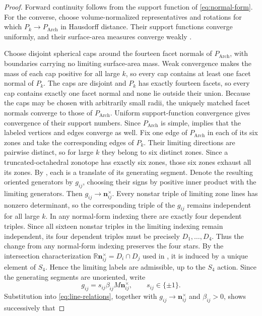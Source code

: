 \documentclass[11pt]{article}
\newcommand{\R}{\mathbb R}
\newcommand{\Arch}{P_{\mathrm{Arch}}}
\newcommand{\mb}[1]{\mathbf{#1}}
\theoremstyle{remark}
\begin{document}
\begin{proof}
Forward continuity follows from the support function of \eqref{eq:normal-form}.  For the
converse, choose volume-normalized representatives and rotations for which
$P_k\to\Arch$ in Hausdorff distance.  Their support functions converge uniformly, and
their surface-area measures converge weakly
\cite[Thms.~1.8.11 and 4.2.1]{Schneider2014}.

Choose disjoint spherical caps around the fourteen facet normals of $\Arch$, with boundaries carrying no limiting surface-area mass.  Weak convergence makes the mass of each cap positive for all large $k$, so every cap contains at least one facet normal of $P_k$. 
The caps are disjoint and $P_k$ has exactly fourteen facets, so every cap contains exactly one facet normal and none lie outside their union.
Because the caps may be chosen with arbitrarily small radii, the uniquely matched facet normals converge to those of $\Arch$. 
Uniform support-function convergence gives convergence of their support numbers.  Since $\Arch$ is simple,  implies that
	the labeled vertices and edges converge as well.
Fix one edge of $\Arch$ in each of its six zones and take the corresponding edges of
$P_k$.  
Their limiting directions are pairwise distinct, so for large $k$ they belong to six distinct zones. 
Since a truncated-octahedral zonotope has exactly six zones, those six zones exhaust all its zones.
By , each is a translate of its generating segment.
Denote the resulting oriented generators by $g_{ij}$, choosing their signs by positive
inner product with the limiting generators.  Then
$g_{ij}\to\mb n_{ij}^{\times}$.
Every nonstar triple of limiting zone lines has nonzero determinant, so the corresponding
triple of the $g_{ij}$ remains independent for all large $k$.  In any normal-form indexing
there are exactly four dependent triples.  Since all sixteen nonstar triples in the limiting
indexing remain independent, its four dependent triples must be precisely
$D_1,\ldots,D_4$.  Thus the change from any normal-form indexing preserves the four
stars.  By the intersection characterization
$\R\mb n_{ij}^{\times}=D_i\cap D_j$ used in , it is induced by
a unique element of $S_4$.  Hence the limiting labels are admissible, up to the $S_4$
action.
Since the generating segments are unoriented, write
\[
g_{ij}=s_{ij}\beta_{ij}M\mb n_{ij}^{\times},
\qquad s_{ij}\in\{\pm1\}.
\]
Substitution into \eqref{eq:line-relations}, together with
$g_{ij}\to\mb n_{ij}^{\times}$ and $\beta_{ij}>0$, shows successively that

\end{proof}
\end{document}
